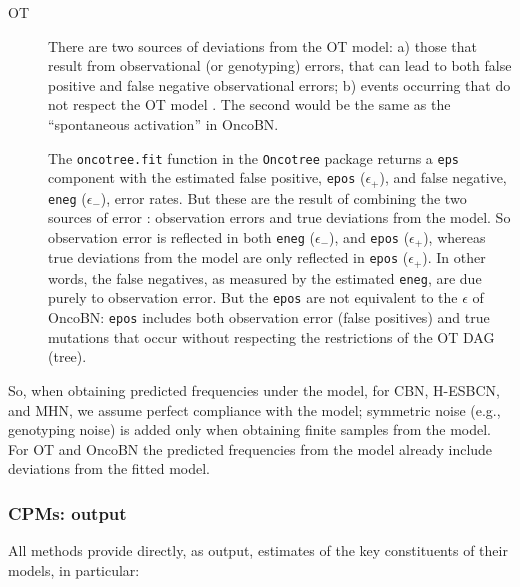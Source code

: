 \documentclass[a4paper,11pt]{article}
\begin{document}
\begin{description}
\item[OT] There are two sources of deviations from the OT model: a) those that result from observational (or genotyping) errors, that can lead to both false positive and false negative observational errors; b) events occurring that do not respect the OT model \citep{Szabo2002,Szabo2008}. The second would be the same as the ``spontaneous activation'' in OncoBN.
  
  The \texttt{oncotree.fit} function in the \texttt{Oncotree} package returns a \texttt{eps} component with the estimated false positive, \texttt{epos} ($\epsilon_+$), and false negative, \texttt{eneg} ($\epsilon_-$), error rates. But these are the result of combining the two sources of error \citep{Szabo2008}: observation errors and true deviations from the model. So observation error is reflected in both \texttt{eneg}  ($\epsilon_-$), and \texttt{epos} ($\epsilon_+$), whereas true deviations from the model are only reflected in \texttt{epos} ($\epsilon_+$). In other words, the false negatives, as measured by the estimated  \texttt{eneg}, are due purely to observation error. But the \texttt{epos} are not equivalent to the $\epsilon$ of OncoBN: \texttt{epos} includes both observation error (false positives) and true mutations that occur without respecting the restrictions of the OT DAG (tree). 
  
\end{description}




So, when obtaining predicted frequencies under the model, for CBN, H-ESBCN, and MHN, we assume perfect compliance with the model; symmetric noise (e.g., genotyping noise) is added only when obtaining finite samples from the model. For OT and OncoBN the predicted frequencies from the model already include deviations from the fitted model.






\subsubsection{CPMs: output}\label{output}
All methods provide directly, as output, estimates of the key constituents of their models, in particular:
\end{document}
